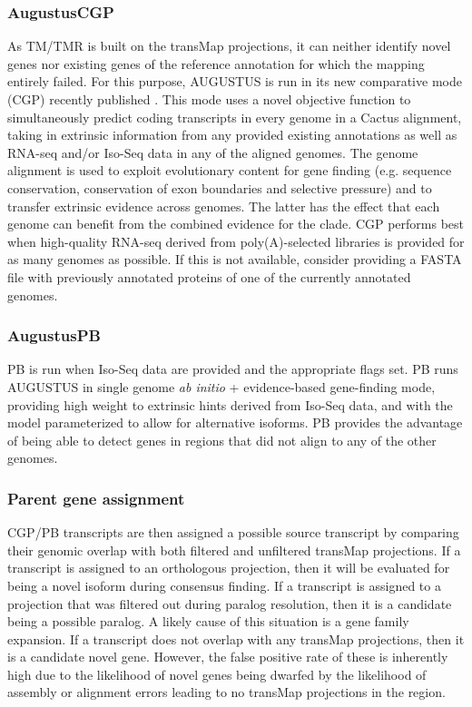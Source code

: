 \documentclass[fleqn,10pt]{wlscirep}
\begin{document}
\subsubsection*{AugustusCGP}
	As TM/TMR is built on the transMap projections, it can neither identify novel genes nor existing genes of the reference annotation for which the mapping entirely failed. For this purpose, AUGUSTUS is run in its new comparative mode (CGP) recently published  \citep{konig2015simultaneous}. This mode uses a novel objective function to simultaneously predict coding transcripts in every genome in a Cactus alignment, taking in extrinsic information from any provided existing annotations as well as RNA-seq and/or Iso-Seq data in any of the aligned genomes. The genome alignment is used to exploit evolutionary content for gene finding (e.g. sequence conservation, conservation of exon boundaries and selective pressure) and to transfer extrinsic evidence across genomes. The latter has the effect that each genome can benefit from the combined evidence for the clade. CGP performs best when high-quality RNA-seq derived from poly(A)-selected libraries is provided for as many genomes as possible. If this is not available, consider providing a FASTA file with previously annotated proteins of one of the currently annotated genomes. 
  
\subsubsection*{AugustusPB}
	PB is run when Iso-Seq data are provided and the appropriate flags set. PB runs AUGUSTUS in single genome \textit{ab initio} + evidence-based gene-finding mode, providing high weight to extrinsic hints derived from Iso-Seq data, and with the model parameterized to allow for alternative isoforms. PB provides the advantage of being able to detect genes in regions that did not align to any of the other genomes.
  
\subsubsection*{Parent gene assignment}
CGP/PB transcripts are then assigned a possible source transcript by comparing their genomic overlap with both filtered and unfiltered transMap projections. If a transcript is assigned to an orthologous projection, then it will be evaluated for being a novel isoform during consensus finding. If a transcript is assigned to a projection that was filtered out during paralog resolution, then it is a candidate being a possible paralog. A likely cause of this situation is a gene family expansion. If a transcript does not overlap with any transMap projections, then it is a candidate novel gene. However, the false positive rate of these is inherently high due to the likelihood of novel genes being dwarfed by the likelihood of assembly or alignment errors leading to no transMap projections in the region.
\end{document}
